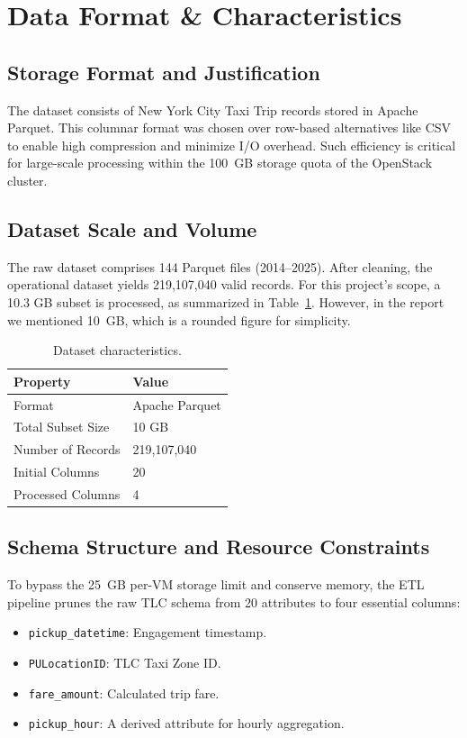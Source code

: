 \section{Data Format \& Characteristics}
\label{sec:data}

\subsection{Storage Format and Justification}
The dataset consists of New York City Taxi Trip records stored in Apache Parquet. This columnar format was chosen over row-based alternatives like CSV to enable high compression and minimize I/O overhead. Such efficiency is critical for large-scale processing within the 100~GB storage quota of the OpenStack cluster.

\subsection{Dataset Scale and Volume}
The raw dataset comprises 144 Parquet files (2014--2025). After cleaning, the operational dataset yields 219,107,040 valid records. For this project's scope, a 10.3 GB subset is processed, as summarized in Table~\ref{tab:dataset}. However, in the report we mentioned 10~GB, which is a rounded figure for simplicity.

\begin{table}[H]
    \centering
    \caption{Dataset characteristics.}
    \label{tab:dataset}
    \begin{tabular}{ll}
        \hline
        \textbf{Property}    & \textbf{Value} \\
        \hline
        Format              & Apache Parquet \\
        Total Subset Size   & 10 GB \\
        Number of Records   & 219,107,040 \\
        Initial Columns     & 20 \\
        Processed Columns   & 4 \\
        \hline
    \end{tabular}
\end{table}

\subsection{Schema Structure and Resource Constraints}
To bypass the 25~GB per-VM storage limit and conserve memory, the ETL pipeline prunes the raw TLC schema from 20 attributes to four essential columns:
\begin{itemize}
    \item \texttt{pickup\_datetime}: Engagement timestamp.
    \item \texttt{PULocationID}: TLC Taxi Zone ID.
    \item \texttt{fare\_amount}: Calculated trip fare.
    \item \texttt{pickup\_hour}: A derived attribute for hourly aggregation.
\end{itemize}

